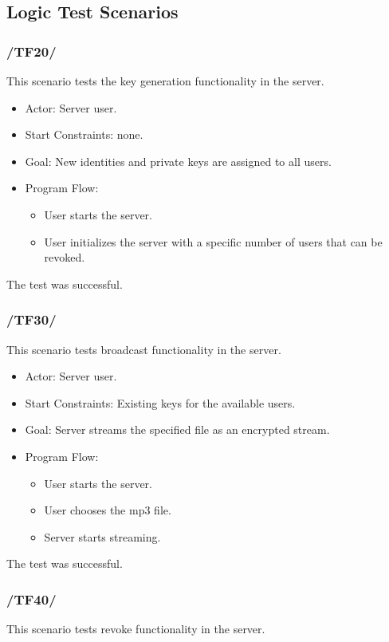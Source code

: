 \documentclass[a4paper,10pt]{scrartcl}
\begin{document}
\subsection{Logic Test Scenarios}

\subsubsection{/TF20/}
This scenario tests the key generation functionality in the server.

\begin{itemize}
	\item Actor: Server user.
	\item Start Constraints: none.
	\item Goal: New identities and private keys are assigned to all users.
	\item Program Flow:
	\begin{itemize}
   \item User starts the server.
   \item User initializes the server with a specific number of users that can be revoked.
\end{itemize}
\end{itemize}
The test was successful.

\subsubsection{/TF30/}
This scenario tests broadcast functionality in the server.

\begin{itemize}
	\item Actor: Server user.
	\item Start Constraints: Existing keys for the available users.
	\item Goal: Server streams the specified file as an encrypted stream.
	\item Program Flow:
	\begin{itemize}
   \item User starts the server.
   \item User chooses the mp3 file.
   \item Server starts streaming.
\end{itemize}
\end{itemize}
The test was successful.

\subsubsection{/TF40/}
This scenario tests revoke functionality in the server.
\end{document}
